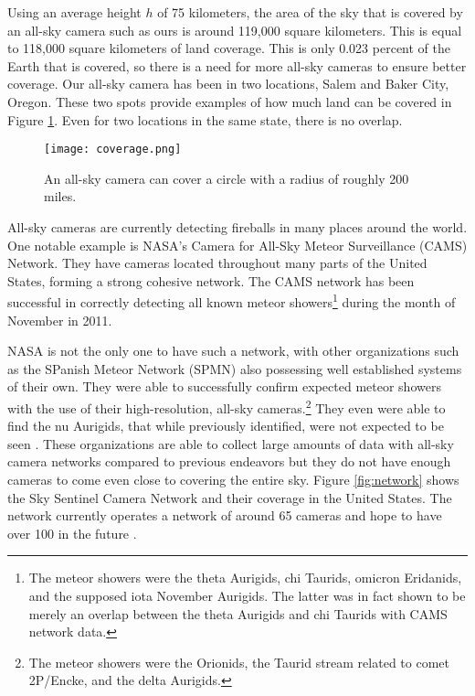 Using an average height $h$ of 75 kilometers, the area of the sky that is covered by an all-sky camera such as ours is around 119,000 square kilometers. This is equal to 118,000 square kilometers of land coverage. This is only 0.023 percent of the Earth that is covered, so there is a need for more all-sky cameras to ensure better coverage. Our all-sky camera has been in two locations, Salem and Baker City, Oregon. These two spots provide examples of how much land can be covered in Figure \ref{fig:coverage}. Even for two locations in the same state, there is no overlap.

\begin{figure}[ht!]
	\centering
	\texttt{[image: coverage.png]}
	\caption{An all-sky camera can cover a circle with a radius of roughly 200 miles.}
	\label{fig:coverage}
\end{figure}


All-sky cameras are currently detecting fireballs in many places around the world. One notable example is NASA's Camera for All-Sky Meteor Surveillance (CAMS) Network. They have cameras located throughout many parts of the United States, forming a strong cohesive network. The CAMS network has been successful in correctly detecting all known meteor showers\footnote{The meteor showers were the theta Aurigids, chi Taurids, omicron Eridanids, and the supposed iota November Aurigids. The latter was in fact shown to be merely an overlap between the theta Aurigids and chi Taurids with CAMS network data.} during the month of November in 2011\cite{Jenniskens2011}.

NASA is not the only one to have such a network, with other organizations such as the SPanish Meteor Network (SPMN) also possessing well established systems of their own. They were  able to successfully confirm expected meteor showers with the use of their high-resolution, all-sky cameras.\footnote{The meteor showers were the Orionids, the Taurid stream related to comet 2P/Encke, and the delta Aurigids.} They even were able to find the nu Aurigids, that while previously identified, were not expected to be seen \cite{Trigo-Rodriguez2007}. These organizations are able to collect large amounts of data with all-sky camera networks compared to previous endeavors but they do not have enough cameras to come even close to covering the entire sky. Figure \ref{fig:network} shows the Sky Sentinel Camera Network and their coverage in the United States. The network currently operates a network of around 65 cameras and hope to have over 100 in the future \cite{Bannister2012}.

